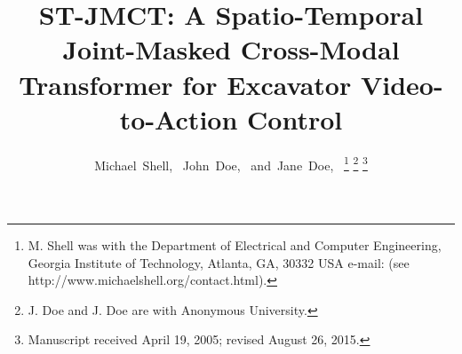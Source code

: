 \documentclass[journal]{IEEEtran}
\begin{document}
%
\title{ST-JMCT: A Spatio-Temporal Joint-Masked Cross-Modal Transformer for Excavator Video-to-Action Control}
%
%
%

\author{Michael~Shell,~
        John~Doe,~
        and~Jane~Doe,~%
\thanks{M. Shell was with the Department
of Electrical and Computer Engineering, Georgia Institute of Technology, Atlanta,
GA, 30332 USA e-mail: (see http://www.michaelshell.org/contact.html).}%
\thanks{J. Doe and J. Doe are with Anonymous University.}%
\thanks{Manuscript received April 19, 2005; revised August 26, 2015.}}

% 
%
\end{document}
